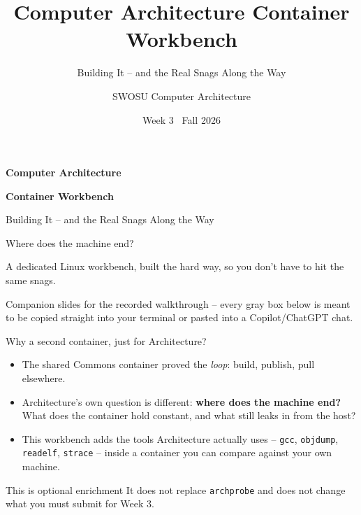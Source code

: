 \documentclass[aspectratio=169,11pt]{beamer}
\title{Computer Architecture Container Workbench}
\subtitle{Building It -- and the Real Snags Along the Way}
\author{SWOSU Computer Architecture}
\date{Week 3 \textbullet\ Fall 2026}
\begin{document}
{
\begin{frame}[plain]
  \vspace{0.8cm}
  {\Huge\bfseries\color{white}Computer Architecture\par}
  \vspace{0.1cm}
  {\Huge\bfseries\color{white}Container Workbench\par}
  \vspace{0.35cm}
  {\Large\color{SoftBlue}Building It -- and the Real Snags Along the Way\par}
  \vfill
  {\large\color{WarmGold}Where does the machine end?}\par
  \vspace{0.15cm}
  {\Large\color{white}A dedicated Linux workbench, built the hard way, so you
  don't have to hit the same snags.\par}
  \vfill
  {\small\color{SoftBlue}Companion slides for the recorded walkthrough --
  every gray box below is meant to be copied straight into your terminal
  or pasted into a Copilot/ChatGPT chat.}
\end{frame}}

\begin{frame}{Why a second container, just for Architecture?}
\begin{itemize}
  \item The shared Commons container proved the \emph{loop}: build, publish,
    pull elsewhere.
  \item Architecture's own question is different: \textbf{where does the
    machine end?} What does the container hold constant, and what still
    leaks in from the host?
  \item This workbench adds the tools Architecture actually uses --
    \texttt{gcc}, \texttt{objdump}, \texttt{readelf}, \texttt{strace} --
    inside a container you can compare against your own machine.
\end{itemize}
\vspace{0.3cm}
\begin{alertblock}{This is optional enrichment}
It does not replace \texttt{archprobe} and does not change what you must
submit for Week 3.
\end{alertblock}
\end{frame}
\end{document}
